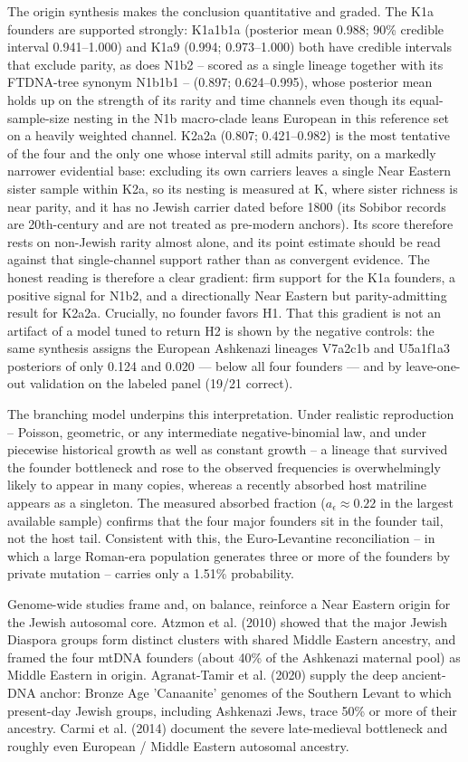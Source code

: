 \documentclass[11pt]{article}
\begin{document}
The origin synthesis makes the conclusion quantitative and graded. The K1a founders are supported strongly: K1a1b1a (posterior mean 0.988; 90\% credible interval 0.941--1.000) and K1a9 (0.994; 0.973--1.000) both have credible intervals that exclude parity, as does N1b2 -- scored as a single lineage together with its FTDNA-tree synonym N1b1b1 -- (0.897; 0.624--0.995), whose posterior mean holds up on the strength of its rarity and time channels even though its equal-sample-size nesting in the N1b macro-clade leans European in this reference set on a heavily weighted channel. K2a2a (0.807; 0.421--0.982) is the most tentative of the four and the only one whose interval still admits parity, on a markedly narrower evidential base: excluding its own carriers leaves a single Near Eastern sister sample within K2a, so its nesting is measured at K, where sister richness is near parity, and it has no Jewish carrier dated before 1800 (its Sobibor records are 20th-century and are not treated as pre-modern anchors). Its score therefore rests on non-Jewish rarity almost alone, and its point estimate should be read against that single-channel support rather than as convergent evidence. The honest reading is therefore a clear gradient: firm support for the K1a founders, a positive signal for N1b2, and a directionally Near Eastern but parity-admitting result for K2a2a. Crucially, no founder favors H1. That this gradient is not an artifact of a model tuned to return H2 is shown by the negative controls: the same synthesis assigns the European Ashkenazi lineages V7a2c1b and U5a1f1a3 posteriors of only 0.124 and 0.020 --- below all four founders --- and by leave-one-out validation on the labeled panel (19/21 correct).

The branching model underpins this interpretation. Under realistic reproduction -- Poisson, geometric, or any intermediate negative-binomial law, and under piecewise historical growth as well as constant growth -- a lineage that survived the founder bottleneck and rose to the observed frequencies is overwhelmingly likely to appear in many copies, whereas a recently absorbed host matriline appears as a singleton. The measured absorbed fraction ($a_\epsilon \approx 0.22$ in the largest available sample) confirms that the four major founders sit in the founder tail, not the host tail. Consistent with this, the Euro-Levantine reconciliation -- in which a large Roman-era population generates three or more of the founders by private mutation -- carries only a 1.51\% probability.

Genome-wide studies frame and, on balance, reinforce a Near Eastern origin for the Jewish autosomal core. Atzmon et al. (2010) showed that the major Jewish Diaspora groups form distinct clusters with shared Middle Eastern ancestry, and framed the four mtDNA founders (about 40\% of the Ashkenazi maternal pool) as Middle Eastern in origin. Agranat-Tamir et al. (2020) supply the deep ancient-DNA anchor: Bronze Age 'Canaanite' genomes of the Southern Levant to which present-day Jewish groups, including Ashkenazi Jews, trace 50\% or more of their ancestry. Carmi et al. (2014) document the severe late-medieval bottleneck and roughly even European / Middle Eastern autosomal ancestry.
\end{document}
